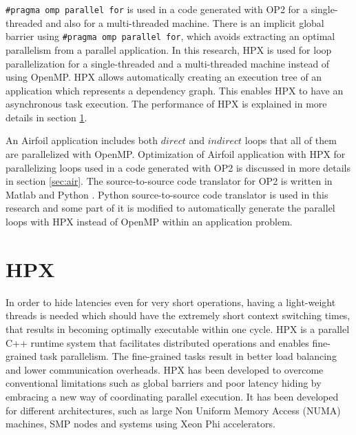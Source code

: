 \documentclass[conference]{IEEEtran}
\begin{document}
\texttt{\#pragma omp parallel for} is used in a code generated with OP2 for a single-threaded and also for a multi-threaded machine. There is an implicit global barrier using \texttt{\#pragma omp parallel for}, which avoids extracting an optimal parallelism from a parallel application. In this research, HPX is used for loop parallelization for a single-threaded and a multi-threaded machine instead of using OpenMP.  HPX allows automatically creating an execution tree of an application which represents a dependency graph. This enables HPX to have an asynchronous task execution. The performance of HPX is explained in more details in section \ref{sec:hpx}.                                                                                                                                                                                                                                                                                                                                                                                                                                                                                                                                                                                                                                                                                                                                                                                                                            


An Airfoil application includes both $direct$ and $indirect$ loops that all of them are parallelized with OpenMP. Optimization of Airfoil application with HPX for parallelizing loops used in a code generated with OP2 is discussed in more details in section \ref{sec:air}. The source-to-source code translator for OP2 is written in Matlab and Python \cite{o3}. Python source-to-source code translator is used in this research and some part of it is modified to automatically generate the parallel loops with HPX instead of OpenMP within an application problem. 


\section{HPX}
\label{sec:hpx}

In order to hide latencies even for very short operations, having a light-weight threads is needed which should have the extremely short context switching times, that results in becoming optimally executable within one cycle. HPX is a parallel C++ runtime system that facilitates distributed operations and enables fine-grained task parallelism. The fine-grained tasks result in better load balancing and lower communication overheads. HPX has been developed  to overcome conventional limitations such as global barriers and poor latency hiding \cite{r6} by embracing a new way of coordinating parallel execution. It has been developed for different architectures, such as large Non Uniform Memory Access (NUMA) machines, SMP nodes and systems using Xeon Phi accelerators.
\end{document}
